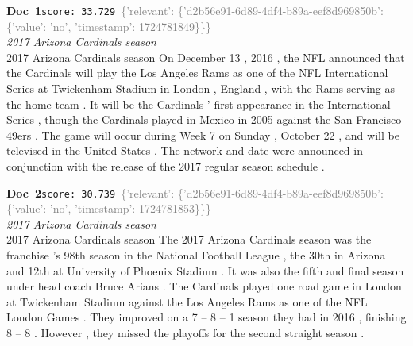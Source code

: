 \documentclass[a4paper,11pt]{article}
\begin{document}
\begin{docenv}
{\footnotesize\textcolor{doccolor}{\textbf{Doc~1}}}\hfill{\tiny\texttt{score:~33.729}}\ {\tiny\textcolor{gray}{\{'relevant': \{'d2b56e91-6d89-4df4-b89a-eef8d969850b': \{'value': 'no', 'timestamp': 1724781849\}\}\}}}\\[3pt]
{\small\textit{2017 Arizona Cardinals season}}\\[2pt]
\vspace{2pt}
{\footnotesize 2017 Arizona Cardinals season
On December 13 , 2016 , the NFL announced that the Cardinals will play the Los Angeles Rams as one of the NFL International Series at Twickenham Stadium in London , England , with the Rams serving as the home team . It will be the Cardinals ' first appearance in the International Series , though the Cardinals played in Mexico in 2005 against the San Francisco 49ers . The game will occur during Week 7 on Sunday , October 22 , and will be televised in the United States . The network and date were announced in conjunction with the release of the 2017 regular season schedule .}
\end{docenv}
\begin{docenv}
{\footnotesize\textcolor{doccolor}{\textbf{Doc~2}}}\hfill{\tiny\texttt{score:~30.739}}\ {\tiny\textcolor{gray}{\{'relevant': \{'d2b56e91-6d89-4df4-b89a-eef8d969850b': \{'value': 'no', 'timestamp': 1724781853\}\}\}}}\\[3pt]
{\small\textit{2017 Arizona Cardinals season}}\\[2pt]
\vspace{2pt}
{\footnotesize 2017 Arizona Cardinals season
The 2017 Arizona Cardinals season was the franchise 's 98th season in the National Football League , the 30th in Arizona and 12th at University of Phoenix Stadium . It was also the fifth and final season under head coach Bruce Arians . The Cardinals played one road game in London at Twickenham Stadium against the Los Angeles Rams as one of the NFL London Games . They improved on a 7 -- 8 -- 1 season they had in 2016 , finishing 8 -- 8 . However , they missed the playoffs for the second straight season .}
\end{docenv}
\end{document}
